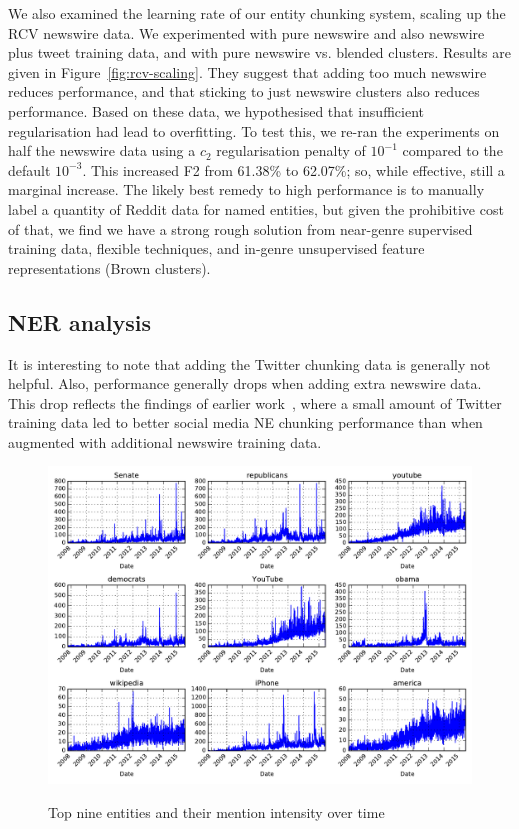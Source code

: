 \documentclass[journal,10pt,draftclsnofoot,onecolumn]{IEEEtran}
\begin{document}
We also examined the learning rate of our entity chunking system, scaling up the RCV newswire data.
We experimented with pure newswire and also newswire plus tweet training data, and with pure newswire vs. blended clusters.
Results are given in Figure~\ref{fig:rcv-scaling}.
They suggest that adding too much newswire reduces performance, and that sticking to just newswire clusters also reduces performance.
Based on these data, we hypothesised that insufficient regularisation had lead to overfitting.
To test this, we re-ran the experiments on half the newswire data using a $c_2$ regularisation penalty of $10^{-1}$ compared to the default $10^{-3}$.
This increased F2 from 61.38\% to 62.07\%; so, while effective, still a marginal increase.
The likely best remedy to high performance is to manually label a quantity of Reddit data for named entities, but given the prohibitive cost of that, we find we have a strong rough solution from near-genre supervised training data, flexible techniques, and in-genre unsupervised feature representations (Brown clusters).




\subsection{NER analysis}%

It is interesting to note that adding the Twitter chunking data is generally not helpful.
Also, performance generally drops when adding extra newswire data.
This drop reflects the findings of earlier work~\cite{ritter2011named}, where a small amount of Twitter training data led to better social media NE chunking performance than when augmented with additional newswire training data.


\begin{figure}
\centering
\caption{Top nine entities and their mention intensity over time}
\includegraphics{plots/entity_ts.pdf}
\label{fig:entity-ts}
\end{figure}
\end{document}
